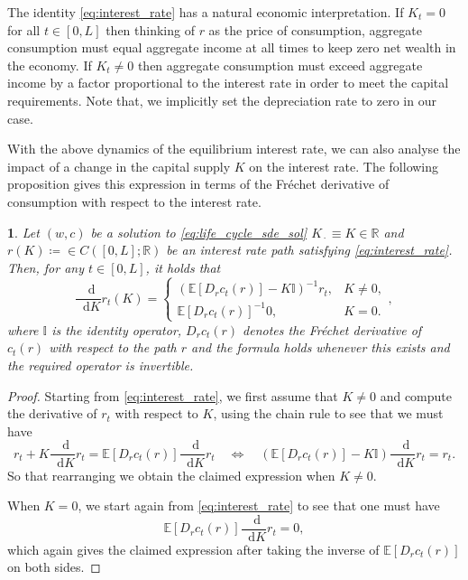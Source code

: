 \documentclass[11pt,oneside,english,reqno,dvipsnames,table]{amsart}
\numberwithin{equation}{section}
\theoremstyle{plain}
\theoremstyle{definition}
\theoremstyle{remark}
\theoremstyle{plain}
\theoremstyle{plain}
\newtheorem{prop}[thm]{\protect\propositionname}
\theoremstyle{plain}
\theoremstyle{plain}
\theoremstyle{plain}
\theoremstyle{plain}
\theoremstyle{plain}
\providecommand{\propositionname}{Proposition}
\newcommand{\EE}{\mathbb{E}}
\newcommand{\dd}{\mathop{}\!\mathrm{d}}
\newcommand{\mbI}{\mathbb{I}}
\newcommand{\mbR}{\mathbb{R}}
\numberwithin{thm}{section}
\begin{document}
The identity \eqref{eq:interest_rate} has a natural economic interpretation. If $K_t =0$ for all $t\in [0,L]$ then thinking of $r$ as the price of consumption, aggregate consumption must equal aggregate income at all times to keep zero net wealth in the economy. 
If $K_t \neq 0$ then aggregate consumption must exceed aggregate income by a factor proportional to the interest rate in order to meet the capital requirements. Note that, we implicitly set the depreciation rate to zero in our case.


With the above dynamics of the equilibrium interest rate, we can also analyse the impact of a change in the capital supply $K$ on the interest rate. The following proposition gives this expression in terms of the Fr\'echet derivative of consumption with respect to the interest rate. 
%
\begin{prop}\label{prop:life_cycle_interest_rate_derivative}
    Let $(w,c)$ be a solution to \eqref{eq:life_cycle_sde_sol} $K_{\,\cdot\,}\equiv K \in \mbR$ and $r(K)\coloneqq \in C([0,L];\mbR)$ be an interest rate path satisfying \eqref{eq:interest_rate}. Then, for any $t\in [0,L]$, it holds that
\begin{equation}\label{eq:r sens K}
\frac{\dd}{\dd K} r_t(K) = \begin{cases}
    (\EE[D_r c_t (r)]-K\mbI)^{-1}r_t, & K\neq 0,\\
    \EE[D_r c_t (r)]^{-1}0, & K=0.
\end{cases},
\end{equation}
%
where $\mbI$ is the identity operator, $D_r c_t(r)$ denotes the Fr\'echet derivative of $c_t(r)$ with respect to the path $r$ and the formula holds whenever this exists and the required operator is invertible. 
\end{prop}
%
\begin{proof}
%
Starting from \eqref{eq:interest_rate}, we first assume that $K\neq 0$ and compute the derivative of $r_t$ with respect to $K$, using the chain rule to see that we must have
%
\begin{equation*}
    r_t  + K \frac{\dd}{\dd K} r_t = \EE[D_rc_t(r)]\frac{\dd}{\dd K} r_t\quad \iff \quad \left(\EE[D_rc_t(r)] - K \mbI\right)\frac{\dd}{\dd K} r_t = r_t.
\end{equation*}
%
 So that rearranging we obtain the claimed expression when $K\neq 0$.
 
 When $K=0$, we start again from \eqref{eq:interest_rate} to see that one must have
 \begin{equation*}
     \EE[D_rc_t(r)]\frac{\dd}{\dd K} r_t = 0,
 \end{equation*}
 which again gives the claimed expression after taking the inverse of $ \EE[D_rc_t(r)]$ on both sides.
\end{proof}
%
\end{document}
